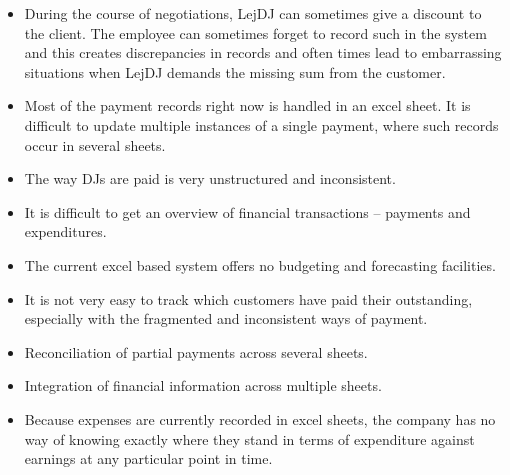 \documentclass[envcountsame]{llncs}
\begin{document}
\begin{itemize}
\item During the course of negotiations, LejDJ can sometimes give a
  discount to the client. The employee can sometimes forget to record
  such in the system and this creates discrepancies in records and
  often times lead to embarrassing situations when LejDJ demands the
  missing sum from the customer.
\item Most of the payment records right now is handled in an excel
  sheet. It is difficult to update multiple instances of a single
  payment, where such records occur in several sheets.
\item The way DJs are paid is very unstructured and inconsistent.
\item It is difficult to get an overview of financial transactions –
  payments and expenditures.
\item The current excel based system offers no budgeting and
  forecasting facilities.
\item It is not very easy to track which customers have paid their
  outstanding, especially with the fragmented and inconsistent ways of
  payment.
\item Reconciliation of partial payments across several sheets.
\item Integration of financial information across multiple sheets.
\item Because expenses are currently recorded in excel sheets, the
  company has no way of knowing exactly where they stand in terms of
  expenditure against earnings at any particular point in time.
\end{itemize}



\end{document}
